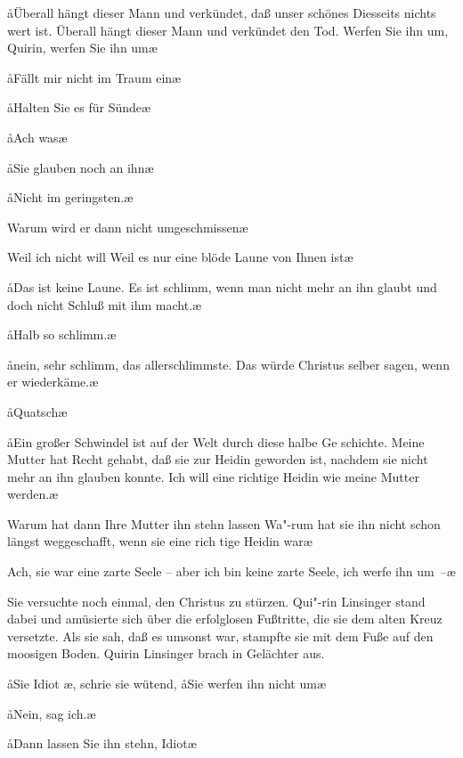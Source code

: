 \aa Überall hängt dieser Mann und verkündet, daß unser schönes
Diesseits nichts wert ist. Überall hängt dieser Mann und
verkündet den Tod. Werfen Sie ihn um, Quirin, werfen Sie
ihn um\ausr\ae

\aa Fällt mir nicht im Traum ein\ausr\ae

\aa Halten Sie es für Sünde\frag\ae

\aa Ach was\ausr\ae

\aa Sie glauben noch an ihn\frag\ae

\aa Nicht im geringsten.\ae

\aanah Warum wird er dann nicht umgeschmissen\frag\ae

\aanah Weil ich nicht will\ausr{} Weil es nur eine blöde Laune von
Ihnen ist\ausr\ae

\aa Das ist keine Laune. Es ist schlimm, wenn man nicht mehr
an ihn glaubt und doch nicht Schluß mit ihm macht.\ae

\aa Halb so schlimm.\ae

\aa nein, sehr schlimm, das allerschlimmste. Das würde Christus
selber sagen, wenn er wiederkäme.\ae

\aa Quatsch\ausr\ae

\aa Ein großer Schwindel ist auf der Welt durch diese halbe Ge\-%
schichte. Meine Mutter hat Recht gehabt, daß sie zur Heidin
geworden ist, nachdem sie nicht mehr an ihn glauben konnte.
Ich will eine richtige Heidin wie meine Mutter werden.\ae

\aanah Warum hat dann Ihre Mutter ihn stehn lassen\frag{} Wa"-rum
hat sie ihn nicht schon längst weggeschafft, wenn sie eine rich\-%
tige Heidin war\frag\ae

\aanah Ach, sie war eine zarte Seele -- aber ich bin keine zarte Seele,
ich werfe ihn um~--\ae

Sie versuchte noch einmal, den Christus zu stürzen. Qui"-rin
Linsinger stand dabei und amüsierte sich über die erfolglosen
Fußtritte, die sie dem alten Kreuz versetzte. Als sie sah, daß
es umsonst war, stampfte sie mit dem Fuße auf den moosigen
Boden. Quirin Linsinger brach in Gelächter aus.

\aa Sie Idiot\eingriff{Idiot\ae, ] Idiot,\ae}%
\ae, schrie sie wütend, \aa Sie werfen ihn nicht um\frag\ae

\aa Nein, sag ich.\ae

\aa Dann lassen Sie ihn stehn, Idiot\ausr\ae

